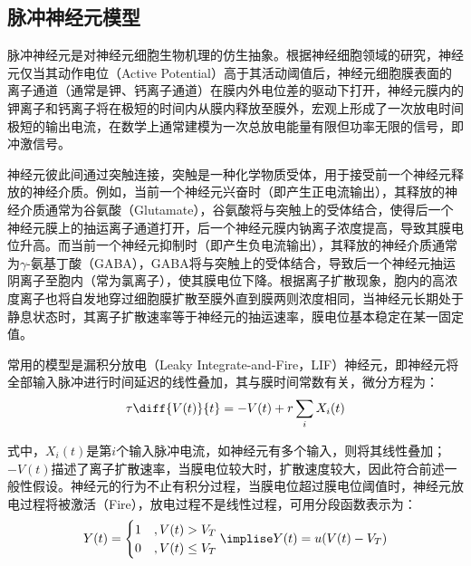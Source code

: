 \documentclass[11pt]{article}
\begin{document}
\subsection{脉冲神经元模型}
脉冲神经元是对神经元细胞生物机理的仿生抽象。根据神经细胞领域的研究\cite{albesa-gonzalezLearningFilopodiaSpines2023}，神经元仅当其动作电位（Active Potential）高于其活动阈值后，神经元细胞膜表面的离子通道（通常是钾、钙离子通道）在膜内外电位差的驱动下打开，神经元膜内的钾离子和钙离子将在极短的时间内从膜内释放至膜外，宏观上形成了一次放电时间极短的输出电流，在数学上通常建模为一次总放电能量有限但功率无限的信号，即冲激信号。\par
神经元彼此间通过突触连接，突触是一种化学物质受体，用于接受前一个神经元释放的神经介质。例如，当前一个神经元兴奋时（即产生正电流输出），其释放的神经介质通常为谷氨酸（Glutamate），谷氨酸将与突触上的受体结合，使得后一个神经元膜上的抽运离子通道打开，后一个神经元膜内钠离子浓度提高，导致其膜电位升高。而当前一个神经元抑制时（即产生负电流输出），其释放的神经介质通常为$\gamma$-氨基丁酸（GABA），GABA将与突触上的受体结合，导致后一个神经元抽运阴离子至胞内（常为氯离子），使其膜电位下降。根据离子扩散现象，胞内的高浓度离子也将自发地穿过细胞膜扩散至膜外直到膜两则浓度相同，当神经元长期处于静息状态时，其离子扩散速率等于神经元的抽运速率，膜电位基本稳定在某一固定值。\par
常用的模型是漏积分放电（Leaky Integrate-and-Fire，LIF）神经元\cite{gerstnerTimeStructureActivity1995}，即神经元将全部输入脉冲进行时间延迟的线性叠加，其与膜时间常数有关，微分方程为：
\begin{align}
  \tau\diff{V(t)}{t}=-V(t)+r\sum\limits_iX_i(t)
  \label{eq:LIF积分过程}
\end{align}\par
式中，$X_i(t)$是第$i$个输入脉冲电流，如神经元有多个输入，则将其线性叠加；$-V(t)$描述了离子扩散速率，当膜电位较大时，扩散速度较大，因此符合前述一般性假设。神经元的行为不止有积分过程，当膜电位超过膜电位阈值时，神经元放电过程将被激活（Fire），放电过程不是线性过程，可用分段函数表示为：
\begin{align}
  Y(t)=\begin{cases}
         1 & ,V(t)>V_T    \\
         0 & ,V(t)\le V_T
       \end{cases}\implise Y(t)=u(V(t)-V_T)
  \label{eq:LIF放电过程}
\end{align}

\newpage
\printbibliography[heading=bibliography,title=参考文献]
\end{document}
